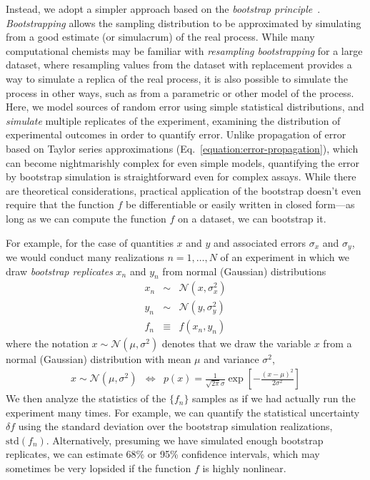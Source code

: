 \documentclass[aps,pre,twocolumn,nofootinbib,superscriptaddress,linenumbers]{revtex4-1}
\begin{document}
Instead, we adopt a simpler approach based on the \emph{bootstrap principle}~\cite{shalizi_simple_????}.
\emph{Bootstrapping} allows the sampling distribution to be approximated by simulating from a good estimate (or simulacrum) of the real process.
While many computational chemists may be familiar with \emph{resampling bootstrapping} for a large dataset, where resampling values from the dataset with replacement provides a way to simulate a replica of the real process, it is also possible to simulate the process in other ways, such as from a parametric or other model of the process.
Here, we model sources of random error using simple statistical distributions, and \emph{simulate} multiple replicates of the experiment, examining the distribution of experimental outcomes in order to quantify error.
Unlike propagation of error based on Taylor series approximations (Eq.~\ref{equation:error-propagation}), which can become nightmarishly complex for even simple models, quantifying the error by bootstrap simulation is straightforward even for complex assays.
While there are theoretical considerations, practical application of the bootstrap doesn't even require that the function $f$ be differentiable or easily written in closed form---as long as we can compute the function $f$ on a dataset, we can bootstrap it.

For example, for the case of quantities $x$ and $y$ and associated errors $\sigma_x$ and $\sigma_y$, we would conduct many realizations $n = 1, \ldots, N$ of an experiment in which we draw \emph{bootstrap replicates} $x_n$ and $y_n$ from normal (Gaussian) distributions
\begin{eqnarray}
x_n &\sim& \mathcal{N}(x, \sigma^2_x) \nonumber \\
y_n &\sim& \mathcal{N}(y, \sigma^2_y) \nonumber \\
f_n &\equiv& f(x_n, y_n)
\end{eqnarray}
where the notation $x \sim \mathcal{N}(\mu, \sigma^2)$ denotes that we draw the variable $x$ from a normal (Gaussian) distribution with mean $\mu$ and variance $\sigma^2$,
\begin{eqnarray}
x \sim \mathcal{N}(\mu, \sigma^2) &\Leftrightarrow& p(x) = \frac{1}{\sqrt{2 \pi} \sigma} \exp\left[-\frac{(x-\mu)^2}{2 \sigma^2}\right]
\end{eqnarray}
We then analyze the statistics of the $\{f_n\}$ samples as if we had actually run the experiment many times.
For example, we can quantify the statistical uncertainty $\delta f$ using the standard deviation over the bootstrap simulation realizations, $\mathrm{std}(f_n)$.
Alternatively, presuming we have simulated enough bootstrap replicates, we can estimate 68\% or 95\% confidence intervals, which may sometimes be very lopsided if the function $f$ is highly nonlinear.
\end{document}
